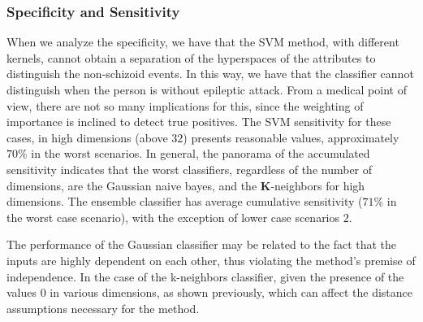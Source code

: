 \subsubsection{Specificity and Sensitivity}

When we analyze the specificity, we have that the SVM method, with different kernels, cannot obtain a separation of the hyperspaces of the attributes to distinguish the non-schizoid events. In this way, we have that the classifier cannot distinguish when the person is without epileptic attack. From a medical point of view, there are not so many implications for this, since the weighting of importance is inclined to detect true positives. The SVM sensitivity for these cases, in high dimensions (above $ 32 $) presents reasonable values, approximately $70\%$ in the worst scenarios. In general, the panorama of the accumulated sensitivity indicates that the worst classifiers, regardless of the number of dimensions, are the Gaussian naive bayes, and the \textbf{K}-neighbors for high dimensions. The ensemble classifier has average cumulative sensitivity ($ 71 \% $ in the worst case scenario), with the exception of lower case scenarios $ 2 $.

The performance of the Gaussian classifier may be related to the fact that the inputs are highly dependent on each other, thus violating the method's premise of independence. In the case of the k-neighbors classifier, given the presence of the values $ 0 $ in various dimensions, as shown previously, which can affect the distance assumptions necessary for the method.

